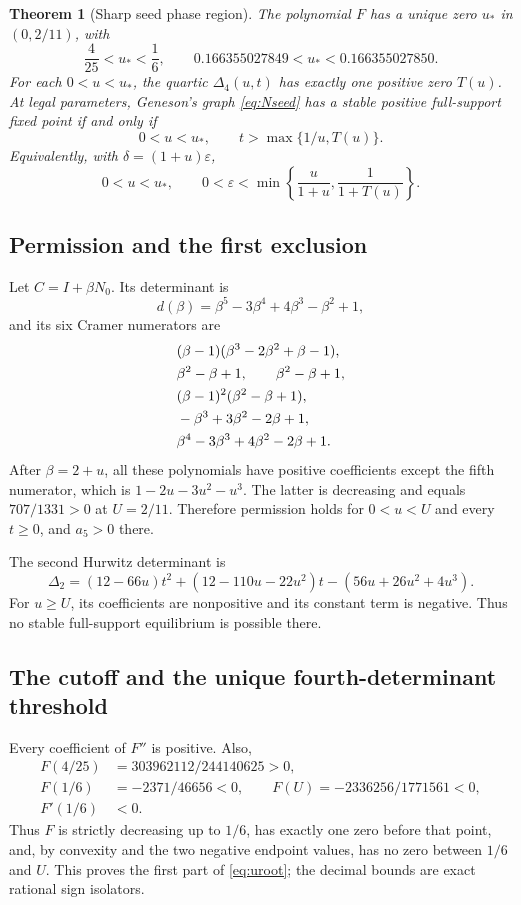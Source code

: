 \documentclass[11pt,a4paper]{article}
\newtheorem{theorem}{Theorem}[section]
\theoremstyle{definition}\newtheorem{definition}[theorem]{Definition}
\theoremstyle{remark}\newtheorem{remark}[theorem]{Remark}
\newcommand{\eps}{\varepsilon}
\begin{document}
\begin{theorem}[Sharp seed phase region]\label{thm:phase}
The polynomial $F$ has a unique zero $u_*$ in $(0,2/11)$, with
\begin{equation}\label{eq:uroot}
 \frac4{25}<u_*<\frac16,\qquad
 0.166355027849<u_*<0.166355027850.
\end{equation}
For each $0<u<u_*$, the quartic $\Delta_4(u,t)$ has exactly one positive zero $T(u)$. At legal parameters, Geneson's graph \eqref{eq:Nseed} has a stable positive full-support fixed point if and only if
\begin{equation}\label{eq:phaseregion}
 \boxed{\quad 0<u<u_*,\qquad t>\max\{1/u,T(u)\}.\quad}
\end{equation}
Equivalently, with $\delta=(1+u)\eps$,
\[
 0<u<u_*,\qquad
 0<\eps<\min\left\{\frac{u}{1+u},\frac1{1+T(u)}\right\}.
\]
\end{theorem}

\subsection{Permission and the first exclusion}
Let $C=I+\beta N_0$. Its determinant is
\[
 d(\beta)=\beta^5-3\beta^4+4\beta^3-\beta^2+1,
\]
and its six Cramer numerators are
\begin{align}\label{eq:seedcramers}
 &(\beta-1)(\beta^3-2\beta^2+\beta-1),\notag\\
 &\beta^2-\beta+1,\qquad \beta^2-\beta+1,\notag\\
 &(\beta-1)^2(\beta^2-\beta+1),\notag\\
 &-\beta^3+3\beta^2-2\beta+1,\notag\\
 &\beta^4-3\beta^3+4\beta^2-2\beta+1.
\end{align}
After $\beta=2+u$, all these polynomials have positive coefficients except the fifth numerator, which is $1-2u-3u^2-u^3$. The latter is decreasing and equals $707/1331>0$ at $U=2/11$. Therefore permission holds for $0<u<U$ and every $t\geq0$, and $a_5>0$ there.

The second Hurwitz determinant is
\begin{equation}\label{eq:phaseD2}
 \Delta_2=(12-66u)t^2+(12-110u-22u^2)t-(56u+26u^2+4u^3).
\end{equation}
For $u\geq U$, its coefficients are nonpositive and its constant term is negative. Thus no stable full-support equilibrium is possible there.

\subsection{The cutoff and the unique fourth-determinant threshold}
Every coefficient of $F''$ is positive. Also,
\begin{align*}
 F(4/25)&=303962112/244140625>0,\\
 F(1/6)&=-2371/46656<0,\qquad F(U)=-2336256/1771561<0,\\
 F'(1/6)&<0.
\end{align*}
Thus $F$ is strictly decreasing up to $1/6$, has exactly one zero before that point, and, by convexity and the two negative endpoint values, has no zero between $1/6$ and $U$. This proves the first part of \eqref{eq:uroot}; the decimal bounds are exact rational sign isolators.
\end{document}
